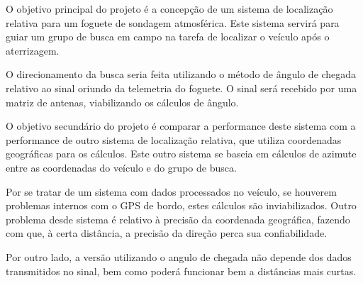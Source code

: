 
O objetivo principal do projeto é a concepção de um sistema de localização relativa para um foguete de sondagem atmosférica.
Este sistema servirá para guiar um grupo de busca em campo na tarefa de localizar o veículo após o aterrizagem.


O direcionamento da busca seria feita utilizando o método de ângulo de chegada relativo ao sinal oriundo da telemetria do foguete.
O sinal será recebido por uma matriz de antenas, viabilizando os cálculos de ângulo.


O objetivo secundário do projeto é comparar a performance deste sistema com a performance de outro sistema de localização relativa, que utiliza coordenadas geográficas para os cálculos.
Este outro sistema se baseia em cálculos de azimute entre as coordenadas do veículo e do grupo de busca.

Por se tratar de um sistema com dados processados no veículo, se houverem problemas internos com o GPS de bordo, estes cálculos são inviabilizados.
Outro problema desde sistema é relativo à precisão da coordenada geográfica, fazendo com que, à certa distância, a precisão da direção perca sua confiabilidade.

Por outro lado, a versão utilizando o angulo de chegada não depende dos dados transmitidos no sinal, bem como poderá funcionar bem a distâncias mais curtas.






